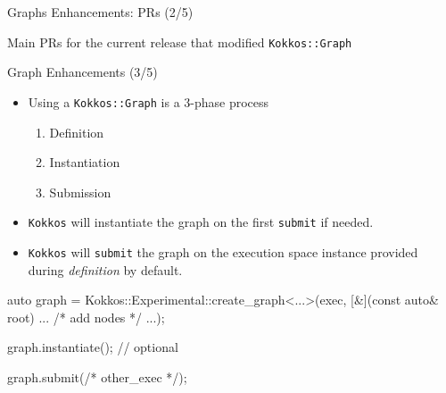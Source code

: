 \begin{frame}[fragile]{Graphs Enhancements: PRs (2/5)}

  Main PRs for the current release that modified \texttt{Kokkos::Graph}
  \begin{itemize}
  \end{itemize}

\end{frame}

\begin{frame}[fragile]{Graph Enhancements (3/5)}

  \begin{itemize}
    \item Using a \texttt{Kokkos::Graph} is a 3-phase process
          \begin{enumerate}
            \item Definition
            \item Instantiation
            \item Submission
          \end{enumerate}

    \item \texttt{Kokkos} will instantiate the graph on the first \texttt{submit} if needed.

    \item \texttt{Kokkos} will \texttt{submit} the graph on the execution space instance provided
  during \emph{definition} by default.
  \end{itemize}

  \begin{code}
    auto graph = Kokkos::Experimental::create_graph<...>(exec,
        [&](const auto& root) {... /* add nodes */ ...});

    graph.instantiate(); // optional

    graph.submit(/* other_exec */);
  \end{code}

\end{frame}

